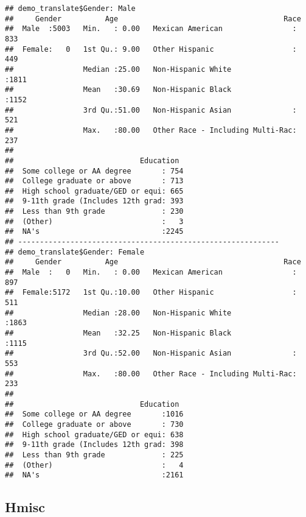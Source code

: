 \documentclass[
]{book}
\newenvironment{Shaded}{\begin{snugshade}}{\end{snugshade}}
\newcommand{\FunctionTok}[1]{\textcolor[rgb]{0.00,0.00,0.00}{#1}}
\newcommand{\NormalTok}[1]{#1}
\newcommand{\SpecialCharTok}[1]{\textcolor[rgb]{0.00,0.00,0.00}{#1}}
\begin{document}
\begin{Shaded}
\end{Shaded}

\begin{verbatim}
## demo_translate$Gender: Male
##     Gender          Age                                      Race     
##  Male  :5003   Min.   : 0.00   Mexican American                : 833  
##  Female:   0   1st Qu.: 9.00   Other Hispanic                  : 449  
##                Median :25.00   Non-Hispanic White              :1811  
##                Mean   :30.69   Non-Hispanic Black              :1152  
##                3rd Qu.:51.00   Non-Hispanic Asian              : 521  
##                Max.   :80.00   Other Race - Including Multi-Rac: 237  
##                                                                       
##                             Education   
##  Some college or AA degree       : 754  
##  College graduate or above       : 713  
##  High school graduate/GED or equi: 665  
##  9-11th grade (Includes 12th grad: 393  
##  Less than 9th grade             : 230  
##  (Other)                         :   3  
##  NA's                            :2245  
## ------------------------------------------------------------ 
## demo_translate$Gender: Female
##     Gender          Age                                      Race     
##  Male  :   0   Min.   : 0.00   Mexican American                : 897  
##  Female:5172   1st Qu.:10.00   Other Hispanic                  : 511  
##                Median :28.00   Non-Hispanic White              :1863  
##                Mean   :32.25   Non-Hispanic Black              :1115  
##                3rd Qu.:52.00   Non-Hispanic Asian              : 553  
##                Max.   :80.00   Other Race - Including Multi-Rac: 233  
##                                                                       
##                             Education   
##  Some college or AA degree       :1016  
##  College graduate or above       : 730  
##  High school graduate/GED or equi: 638  
##  9-11th grade (Includes 12th grad: 398  
##  Less than 9th grade             : 225  
##  (Other)                         :   4  
##  NA's                            :2161
\end{verbatim}

\hypertarget{hmisc}{%
\subsection{Hmisc}\label{hmisc}}
\end{document}

